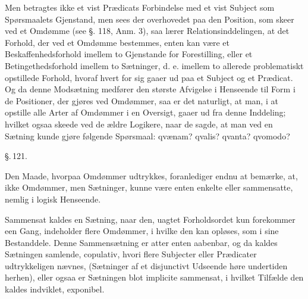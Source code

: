 \documentclass[12pt]{book}
\def\textit#1{#1}%
\def\emph#1{#1}%
\newcommand{\parag}[1]{%
  \par\vspace{0.9\baselineskip}%
  {\centering\textit{\S.\,#1.}\par}%
  \vspace{0.35\baselineskip}%
  \noindent\hspace{\parindent}\ignorespaces
}
\newcommand{\opage}[1]{\marginnote{\footnotesize\textit{[#1]}}}
\begin{document}
Men betragtes ikke et vist Prædicats Forbindelse med et vist Subject som
Spørsmaalets Gjenstand, men sees der overhovedet paa den Position, som skeer ved
et Omdømme (see §. 118, Anm. 3), saa lærer Relationsinddelingen, at det Forhold,
der ved et Omdømme bestemmes, enten kan være et \emph{Beskaffenhedsforhold}
imellem to Gjenstande for Forestilling, eller et \emph{Betingethedsforhold}
imellem to Sætninger, d. e. imellem to allerede problematiskt opstillede Forhold,
hvoraf hvert for sig gaaer ud paa et Subject og et Prædicat. Og da denne
Modsætning medfører den største Afvigelse i Henseende til Form i de Positioner,
der gjøres ved Omdømmer, saa er det naturligt, at man, i at opstille alle Arter
af Omdømmer i en Oversigt, gaaer ud fra denne Inddeling; hvilket ogsaa skeede ved
de ældre Logikere, naar de sagde, at man ved en Sætning kunde gjøre følgende
Spørsmaal: \textit{qvænam? qvalis? qvanta? qvomodo?}

\parag{121}

Den Maade, hvorpaa Omdømmer udtrykkes, foranlediger endnu at bemærke, at, ikke
Omdømmer, men Sætninger, kunne være enten
\opage{294} enkelte eller sammensatte, nemlig i logisk Henseende.

Sammensat kaldes en Sætning, naar den, uagtet Forholdsordet kun forekommer een
Gang, indeholder flere Omdømmer, i hvilke den kan opløses, som i sine
Bestanddele. Denne Sammensætning er atter enten aabenbar, og da kaldes
Sætningen samlende, \textit{copulativ}, hvori flere Subjecter eller Prædicater
udtrykkeligen nævnes, (Sætninger af et disjunctivt Udseende høre undertiden
herhen), eller ogsaa er Sætningen blot \textit{implicite} sammensat, i hvilket
Tilfælde den kaldes indviklet, \textit{exponibel}.
\end{document}
